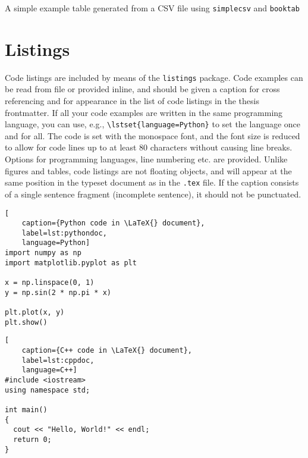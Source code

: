 \begin{table}[tbp]
  \centering
  \caption[A simple example table generated from a CSV file]{A simple example table generated from a CSV file using \texttt{simplecsv} and \texttt{booktab}}
  \label{tab:examplecsv}
\end{table}

\section{Listings}

Code listings are included by means of the \texttt{listings} package. Code examples can be read from file or provided inline, and should be given a caption for cross referencing and for appearance in the list of code listings in the thesis frontmatter. If all your code examples are written in the same programming language, you can use, e.g., \texttt{\textbackslash lstset\{language=Python\}} to set the language once and for all. The code is set with the monospace font, and the font size is reduced to allow for code lines up to at least 80 characters without causing line breaks. Options for programming languages, line numbering etc. are provided. Unlike figures and tables, code listings are not floating objects, and will appear at the same position in the typeset document as in the \texttt{.tex} file. If the caption consists of a single sentence fragment (incomplete sentence), it should not be punctuated.





\begin{lstlisting}[
    caption={Python code in \LaTeX{} document},
    label=lst:pythondoc,
    language=Python]
import numpy as np
import matplotlib.pyplot as plt

x = np.linspace(0, 1)
y = np.sin(2 * np.pi * x)

plt.plot(x, y)
plt.show()
\end{lstlisting}

\begin{lstlisting}[
    caption={C++ code in \LaTeX{} document},
    label=lst:cppdoc,
    language=C++]
#include <iostream>
using namespace std;

int main()
{
  cout << "Hello, World!" << endl;
  return 0;
}
\end{lstlisting}

